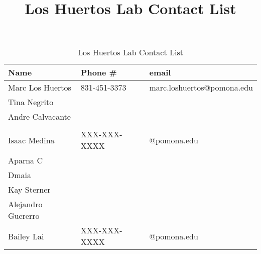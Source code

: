 \documentclass{article}
\title{Los Huertos Lab Contact List}
\begin{document}


\begin{table}[tp]
\caption{Los Huertos Lab Contact List}
\begin{tabular}{lll}\hline
Name                & Phone \#      & email   \\ \hline
Marc Los Huertos    & 831-451-3373  & marc.loshuertos@pomona.edu \\
Tina Negrito        &               & \\
Andre Calvacante    &               & \\
\\

Isaac Medina        & XXX-XXX-XXXX  & @pomona.edu \\
Aparna C              &&\\
Dmaia               &&\\
Kay Sterner         &               & \\
Alejandro Guererro  &               & \\           
Bailey Lai          & XXX-XXX-XXXX  & @pomona.edu \\\hline
\end{tabular}
\end{table}
\end{document}
